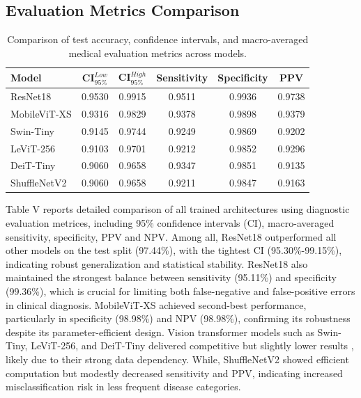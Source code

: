 \documentclass[conference,9pt]{IEEEtran}
\begin{document}
\subsection{Evaluation Metrics Comparison }
\begin{table}[H]
\centering
\caption{Comparison of test accuracy, confidence intervals, and macro-averaged medical evaluation metrics across models.}
\label{tab:advanced_metrics}
\begin{tabular}{l c c c c c}
\toprule
\textbf{Model} &
\textbf{CI$_{95\%}^{Low}$} &
\textbf{CI$_{95\%}^{High}$} &
\textbf{Sensitivity} &
\textbf{Specificity} &
\textbf{PPV} \\
\midrule
ResNet18 & 0.9530 & 0.9915 & 0.9511 & 0.9936 & 0.9738 \\
MobileViT-XS & 0.9316 & 0.9829 & 0.9378 & 0.9898 & 0.9379 \\
Swin-Tiny & 0.9145 & 0.9744 & 0.9249 & 0.9869 & 0.9202 \\
LeViT-256 & 0.9103 & 0.9701 & 0.9212 & 0.9852 & 0.9296 \\
DeiT-Tiny & 0.9060 & 0.9658 & 0.9347 & 0.9851 & 0.9135 \\
ShuffleNetV2 & 0.9060 & 0.9658 & 0.9211 & 0.9847 & 0.9163 \\
\bottomrule
\end{tabular}
\end{table}
Table V reports detailed comparison of all trained architectures using diagnostic evaluation metrices, including 95\% confidence intervals (CI), macro-averaged sensitivity, specificity, PPV and NPV. Among all, ResNet18 outperformed all other models on the test split (97.44\%), with the tightest CI (95.30\%-99.15\%), indicating robust generalization and statistical stability. ResNet18 also maintained the strongest balance between sensitivity (95.11\%) and specificity (99.36\%), which is crucial for limiting both false-negative and false-positive errors in clinical diagnosis.
MobileViT-XS achieved second-best performance, particularly in specificity (98.98\%) and NPV (98.98\%), confirming its robustness despite its parameter-efficient design.  Vision transformer models such as Swin-Tiny, LeViT-256, and DeiT-Tiny delivered competitive but slightly lower results , likely due to their strong data dependency. While, ShuffleNetV2 showed efficient computation but modestly decreased sensitivity and PPV, indicating increased misclassification risk in less frequent disease categories. 
\end{document}
